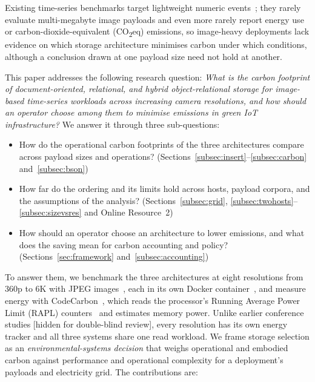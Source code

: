 \documentclass[pdflatex,sn-basic]{sn-jnl}%
\begin{document}
Existing time-series benchmarks target lightweight numeric events~\citep{tsbs,cratedb_ts_benchmark,diva_timescaledb_mongodb_eval}; they rarely evaluate multi-megabyte image payloads and even more rarely report energy use or carbon-dioxide-equivalent (CO\textsubscript{2}eq) emissions, so image-heavy deployments lack evidence on which storage architecture minimises carbon under which conditions, although a conclusion drawn at one payload size need not hold at another.

This paper addresses the following research question: \emph{What is the carbon footprint of document-oriented, relational, and hybrid object-relational storage for image-based time-series workloads across increasing camera resolutions, and how should an operator choose among them to minimise emissions in green IoT infrastructure?} We answer it through three sub-questions:
\begin{itemize}
  \item[RQ1] How do the operational carbon footprints of the three architectures compare across payload sizes and operations? (Sections~\ref{subsec:insert}--\ref{subsec:carbon} and~\ref{subsec:bson})
  \item[RQ2] How far do the ordering and its limits hold across hosts, payload corpora, and the assumptions of the analysis? (Sections~\ref{subsec:grid}, \ref{subsec:twohosts}--\ref{subsec:sizevsres} and Online Resource~2)
  \item[RQ3] How should an operator choose an architecture to lower emissions, and what does the saving mean for carbon accounting and policy? (Sections~\ref{sec:framework} and~\ref{subsec:accounting})
\end{itemize}
To answer them, we benchmark the three architectures at eight resolutions from 360p to 6K with JPEG images~\citep{wallace_jpeg}, each in its own Docker container~\citep{docker_official}, and measure energy with CodeCarbon~\citep{codecarbon}, which reads the processor's Running Average Power Limit (RAPL) counters~\citep{david_rapl} and estimates memory power. Unlike earlier conference studies [hidden for double-blind review], every resolution has its own energy tracker and all three systems share one read workload. We frame storage selection as an \emph{environmental-systems decision} that weighs operational and embodied carbon against performance and operational complexity for a deployment's payloads and electricity grid. The contributions are:
\end{document}
